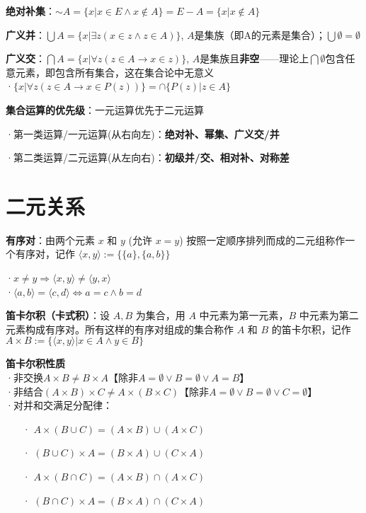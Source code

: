 	\textbf{绝对补集}：$\sim A = \{x | x \in E \land x \notin A\} = E - A = \{x | x \notin A\}$
	
	\textbf{广义并}：$\bigcup A = \{x | \exists z (x \in z \land z \in A)\}$, $A$是集族（即A的元素是集合）；$\bigcup \emptyset = \emptyset$
	
	\textbf{广义交}：$\bigcap A = \{x | \forall z (z \in A \rightarrow x \in z)\}$, $A$是集族且\textbf{非空}——理论上$\bigcap \emptyset$包含任意元素，即包含所有集合，这在集合论中无意义\\
	·$\{x | \forall z (z \in A \rightarrow x \in P(z))\}=\cap\{P(z)|z\in A\}$
	
	\textbf{集合运算的优先级}：一元运算优先于二元运算
	
	·第一类运算/一元运算(从右向左)：\textbf{绝对补、幂集、广义交/并}
	
	·第二类运算/二元运算(从左向右)：\textbf{初级并/交、相对补、对称差}
	
	\section*{二元关系}
	\textbf{有序对}：由两个元素 $x$ 和 $y$ (允许 $x = y$) 按照一定顺序排列而成的二元组称作一个有序对，记作 $\langle x, y \rangle := \{\{a\}, \{a, b\}\}$
	
	·$x \neq y \Rightarrow \langle x, y \rangle \neq \langle y, x \rangle$\\
	·$\langle a, b \rangle = \langle c, d \rangle \Leftrightarrow a = c \land b = d$
	
	\textbf{笛卡尔积（卡式积）}：设 $A, B$ 为集合，用 $A$ 中元素为第一元素，$B$ 中元素为第二元素构成有序对。所有这样的有序对组成的集合称作 $A$ 和 $B$ 的笛卡尔积，记作 $A \times B:=\{ \langle x, y \rangle | x \in A \land y \in B \}$
	
	\textbf{笛卡尔积性质}\\
	·非交换$A \times B \neq B \times A$【除非$A = \emptyset \lor B = \emptyset \lor A = B$】\\	
	·非结合$(A \times B) \times C \neq A \times (B \times C)$【除非$A = \emptyset \lor B = \emptyset \lor C = \emptyset$】\\	
	·对并和交满足分配律：
	\begin{itemize}
		\item[·] $A \times (B \cup C) = (A \times B) \cup (A \times C)$
		\item[·] $(B \cup C) \times A = (B \times A) \cup (C \times A)$
		\item[·] $A \times (B \cap C) = (A \times B) \cap (A \times C)$
		\item[·] $(B \cap C) \times A = (B \times A) \cap (C \times A)$
	\end{itemize}

